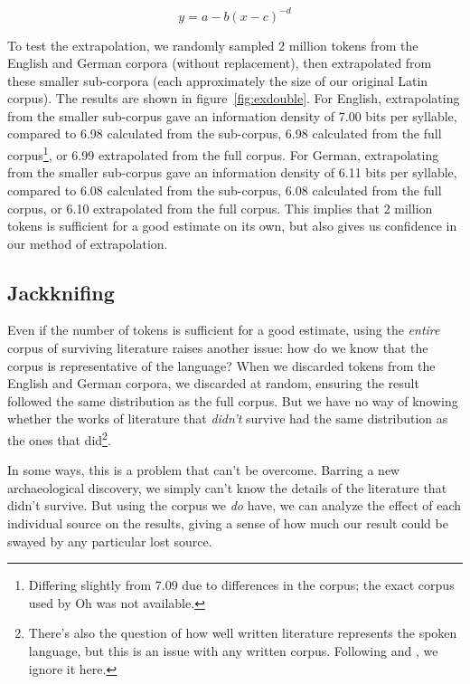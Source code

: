 \documentclass[12pt,twoside]{article}
\begin{document}
\begin{equation}
\label{eq:hyperbola}
y = a-b(x-c)^{-d}
\end{equation}

To test the extrapolation, we randomly sampled 2 million tokens from the English and German corpora (without replacement), then extrapolated from these smaller sub-corpora (each approximately the size of our original Latin corpus). The results are shown in figure~\ref{fig:exdouble}. For English, extrapolating from the smaller sub-corpus gave an information density of 7.00 bits per syllable, compared to 6.98 calculated from the sub-corpus, 6.98 calculated from the full corpus\footnote{Differing slightly from  7.09 due to differences in the corpus; the exact corpus used by Oh was not available.}, or 6.99 extrapolated from the full corpus. For German, extrapolating from the smaller sub-corpus gave an information density of 6.11 bits per syllable, compared to 6.08 calculated from the sub-corpus, 6.08 calculated from the full corpus, or 6.10 extrapolated from the full corpus. This implies that 2 million tokens is sufficient for a good estimate on its own, but also gives us confidence in our method of extrapolation.

\subsection{Jackknifing}

Even if the number of tokens is sufficient for a good estimate, using the \emph{entire} corpus of surviving literature raises another issue: how do we know that the corpus is representative of the language? When we discarded tokens from the English and German corpora, we discarded at random, ensuring the result followed the same distribution as the full corpus. But we have no way of knowing whether the works of literature that \emph{didn't} survive had the same distribution as the ones that did\footnote{There's also the question of how well written literature represents the spoken language, but this is an issue with any written corpus. Following \citet{oh} and \citet{coupé}, we ignore it here.}.

In some ways, this is a problem that can't be overcome. Barring a new archaeological discovery, we simply can't know the details of the literature that didn't survive. But using the corpus we \emph{do} have, we can analyze the effect of each individual source on the results, giving a sense of how much our result could be swayed by any particular lost source.
\end{document}
